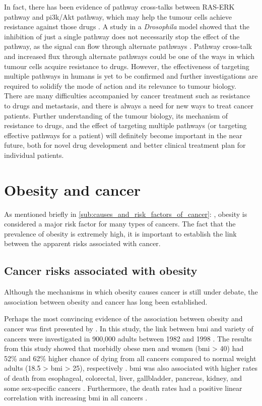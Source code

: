 In fact, there has been evidence of pathway cross-talks between RAS-ERK pathway and \gls{pi3k}/Akt pathway, which may help the tumour cells achieve resistance against those drugs \citep{Moelling2002,Zimmermann1999a}.
A study in a \textit{Drosophila} model showed that the inhibition of just a single pathway does not necessarily stop the effect of the pathway, as the signal can flow through alternate pathways \citep{Dar2012}.
Pathway cross-talk and increased flux through alternate pathways could be one of the ways in which tumour cells acquire resistance to drugs.
However, the effectiveness of targeting multiple pathways in humans is yet to be confirmed and further investigations are required to solidify the mode of action and its relevance to tumour biology.
\\

\noindent
There are many difficulties accompanied by cancer treatment such as resistance to drugs and metastasis, and there is always a need for new ways to treat cancer patients.
Further understanding of the tumour biology, its mechanism of resistance to drugs, and the effect of targeting multiple pathways (or targeting effective pathways for a patient) will definitely become important in the near future, both for novel drug development and better clinical treatment plan for individual patients.

\section{Obesity and cancer}
\label{sec:obesity_and_cancer}

As mentioned briefly in \cref{sub:causes_and_risk_factors_of_cancer}: , obesity is considered a major risk factor for many types of cancers.
The fact that the prevalence of obesity is extremely high, it is important to establish the link between the apparent risks associated with cancer.

\subsection{Cancer risks associated with obesity}
\label{sub:cancer_risks_associated_with_obesity}

Although the mechanisms in which obesity causes cancer is still under debate, the association between obesity and cancer has long been established.

Perhaps the most convincing evidence of the association between obesity and cancer was first presented by \citet{Calle2003}.
In this study, the link between \gls{bmi} and variety of cancers were investigated in 900,000 adults between 1982 and 1998 \citep{Calle2003}.
The results from this study showed that morbidly obese men and women (\gls{bmi} \textgreater{} 40) had 52\% and 62\% higher chance of dying from all cancers compared to normal weight adults (18.5 \textgreater{} \gls{bmi} \textgreater{} 25), respectively \citep{Calle2003}.
\gls{bmi} was also associated with higher rates of death from esophageal, colorectal, liver, gallbladder, pancreas, kidney, and some sex-specific cancers \citep{Calle2003}.
Furthermore, the death rates had a positive linear correlation with increasing \gls{bmi} in all cancers \citep{Calle2003}.

